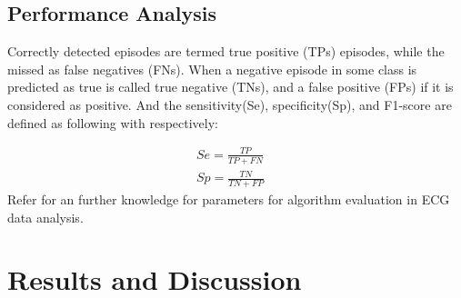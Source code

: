 \documentclass[journal]{IEEEtran}
\begin{document}
%
%

\subsection{Performance Analysis}
Correctly detected episodes are termed true positive (TPs) episodes, while the missed as false negatives (FNs).
When a negative episode in some class is predicted as true is called true negative (TNs), and a false positive (FPs) if it is considered as positive. And the sensitivity(Se), specificity(Sp), and F1-score are defined as following with respectively:

\begin{equation}
\begin{split}
Se = \frac{TP}{TP+FN} \quad \\
 Sp = \frac{TN}{TN+FP}
\end{split}
\end{equation}
Refer \cite{mar} for an further knowledge for parameters for algorithm evaluation in ECG data analysis.

\lipsum[1-4]

%
%


\section{Results and Discussion}
\end{document}
